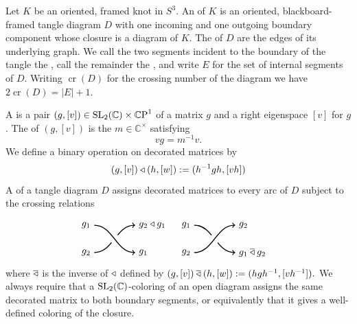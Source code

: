 \documentclass[margincite, leqno]{sl2art}
\numberwithin{equation}{section}
\begin{document}
\begin{definition}
  Let \(K\) be an oriented, framed knot in \(S^{3}\).
  An  of \(K\) is an oriented,
  blackboard-framed tangle diagram \(D\) with one incoming and one
  outgoing boundary component whose closure is a diagram of \(K\).
  The  of \(D\) are the edges of its underlying graph.
  We call the two segments incident to the boundary of the tangle the
  , call the remainder the
  , and write \(E\) for the set of
  internal segments of \(D\).
  Writing \(\operatorname{cr}(D)\) for the crossing number of the
  diagram we have \(2 \operatorname{cr}(D) = |E| + 1\).
\end{definition}

\begin{definition}
  A  is a pair \((g, [v]) \in \slg \times
  \pjsp\) of a matrix \(g\) and a right eigenspace \([v]\) for \(g\).
  The  of \((g, [v])\) is the \(m
  \in \mathbb{C}^{\times}\) satisfying
  \[
    vg = m^{-1} v.
  \]
  We define a binary operation on decorated matrices by
  \begin{equation}
    (g, [v]) \triangleleft (h, [w])
    \mathrel{:=}
    (h^{-1} g h, [v h])
  \end{equation}
  A  of a tangle diagram \(D\)
  assigns decorated matrices to every arc of \(D\) subject to the
  crossing relations
  \begin{equation}
    \begin{aligned}
      &
      \begin{tikzpicture}[line width=1, baseline=30, scale=1]
        \draw[->] (0,0) node[left] {\(g_{2}\)} \br (1.5,1)
        node[right] {\(g_{2} \qn g_{1}\)};
        \draw[white, line width=10] (0,1) node[left] {} \br (1.5,0)
        node[right] {};
        \draw[->] (0,1) node[left] {\(g_{1}\)} \br (1.5,0)
        node[right] {\(g_{1}\)};
      \end{tikzpicture}
      &
      &
      \begin{tikzpicture}[line width=1, baseline=30, scale=1]
        \draw[->] (0,1) node[left] {\(g_{1}\)} \br (1.5,0)
        node[right] {\(g_{1} \qninv g_{2}\)};
        \draw[white, line width=10] (0,0) node[left] {} \br (1.5,1)
        node[right] {};
        \draw[->] (0,0) node[left] {\(g_{2}\)} \br (1.5,1)
        node[right] {\(g_{2}\)};
      \end{tikzpicture}
    \end{aligned}
  \end{equation}
  where \(\mathbin{\overline{\triangleleft}}\) is the inverse of \(\triangleleft\) defined by
  \(
    (g, [v]) \mathbin{\overline{\triangleleft}} (h, [w])
    \mathrel{:=}
    (h g h^{-1}, [v h^{-1}]).
  \)
  We always require that a \(\operatorname{SL}_2(\mathbb{C})\)-coloring of an open diagram
  assigns the same decorated matrix to both boundary segments, or
  equivalently that it gives a well-defined coloring of the closure.
\end{definition}
\end{document}
